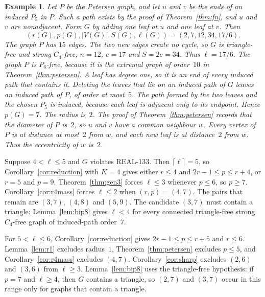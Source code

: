 \documentclass[ASNA]{USG}
\theoremstyle{WBstyletwo}
\newtheorem{example}[theorem]{Example}
\numberwithin{equation}{section}
\newcommand{\lr}{\ell}
\newcommand{\pp}{p}
\begin{document}
\begin{example}\label{ex:p5leaves}
Let $P$ be the Petersen graph, and let $u$ and $v$ be the ends of an induced $P_5$ in $P$. Such a path exists by the proof of Theorem~\ref{thm:fn}, and $u$ and $v$ are nonadjacent. Form $G$ by adding one leaf at $u$ and one leaf at $v$. Then
\[
(r(G),\pp(G),|V(G)|,S(G),\lr(G))=(2,7,12,34,17/6).
\]
The graph $P$ has $15$ edges. The two new edges create no cycle, so $G$ is triangle-free and strong $C_4$-free, $n=12$, $e=17$ and $S=2e=34$. Thus $\lr=17/6$. The graph $P$ is $P_6$-free, because it is the extremal graph of order~$10$ in Theorem~\ref{thm:petersen}. A leaf has degree one, so it is an end of every induced path that contains it. Deleting the leaves that lie on an induced path of $G$ leaves an induced path of $P$, of order at most~$5$. The path formed by the two leaves and the chosen $P_5$ is induced, because each leaf is adjacent only to its endpoint. Hence $\pp(G)=7$. The radius is~$2$. The proof of Theorem~\ref{thm:petersen} records that the diameter of $P$ is~$2$, so $u$ and $v$ have a common neighbour $w$. Every vertex of $P$ is at distance at most~$2$ from $w$, and each new leaf is at distance~$2$ from $w$. Thus the eccentricity of $w$ is~$2$.
\end{example}

Suppose $4<\lr\le 5$ and $G$ violates REAL-133. Then $\lceil\lr\rceil=5$, so Corollary~\ref{cor:reduction} with $K=4$ gives either $r\le 4$ and $2r-1\le\pp\le r+4$, or $r=5$ and $\pp=9$. Theorem~\ref{thm:gen3} forces $\lr\le 3$ whenever $\pp\le 6$, so $\pp\ge 7$. Corollary~\ref{cor:r4mass} forces $\lr\le 2$ when $(r,\pp)=(4,7)$. The pairs that remain are $(3,7)$, $(4,8)$ and $(5,9)$. The candidate $(3,7)$ must contain a triangle: Lemma~\ref{lem:bip8} gives $\lr<4$ for every connected triangle-free strong $C_4$-free graph of induced-path order~$7$.

For $5<\lr\le 6$, Corollary~\ref{cor:reduction} gives $2r-1\le\pp\le r+5$ and $r\le 6$. Lemma~\ref{lem:r1} excludes radius~$1$, Theorem~\ref{thm:petersen} excludes $\pp\le 5$, and Corollary~\ref{cor:r4mass} excludes $(4,7)$. Corollary~\ref{cor:sharp} excludes $(2,6)$ and $(3,6)$ from $\lr\ge 3$. Lemma~\ref{lem:bip8} uses the triangle-free hypothesis: if $\pp=7$ and $\lr\ge 4$, then $G$ contains a triangle, so $(2,7)$ and $(3,7)$ occur in this range only for graphs that contain a triangle.
\end{document}
